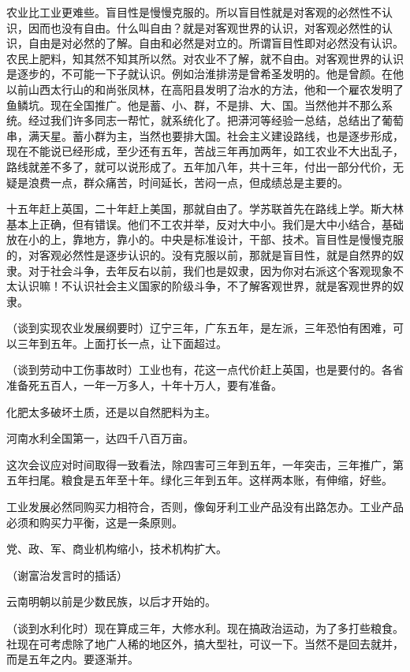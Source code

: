农业比工业更难些。盲目性是慢慢克服的。所以盲目性就是对客观的必然性不认识，因而也没有自由。什么叫自由？就是对客观世界的认识，对客观必然性的认识，自由是对必然的了解。自由和必然是对立的。所谓盲目性即对必然没有认识。农民上肥料，知其然不知其所以然。对农业不了解，就不自由。对客观世界的认识是逐步的，不可能一下子就认识。例如治淮排涝是曾希圣发明的。他是曾颜。在他以前山西太行山的和尚张凤林，在高阳县发明了治水的方法，他和一个雇农发明了鱼鳞坑。现在全国推广。他是蓄、小、群，不是排、大、国。当然他并不那么系统。经过我们许多同志一帮忙，就系统化了。把漭河等经验一总结，总结出了葡萄串，满天星。蓄小群为主，当然也要排大国。社会主义建设路线，也是逐步形成，现在不能说已经形成，至少还有五年，苦战三年再加两年，如工农业不大出乱子，路线就差不多了，就可以说形成了。五年加八年，共十三年，付出一部分代价，无疑是浪费一点，群众痛苦，时间延长，苦闷一点，但成绩总是主要的。

十五年赶上英国，二十年赶上美国，那就自由了。学苏联首先在路线上学。斯大林基本上正确，但有错误。他们不工农并举，反对大中小。我们是大中小结合，基础放在小的上，靠地方，靠小的。中央是标准设计，干部、技术。盲目性是慢慢克服的，对客观必然性是逐步认识的。没有克服以前，那就是盲目性，就是自然界的奴隶。对于社会斗争，去年反右以前，我们也是奴隶，因为你对右派这个客观现象不太认识嘛！不认识社会主义国家的阶级斗争，不了解客观世界，就是客观世界的奴隶。

（谈到实现农业发展纲要时）辽宁三年，广东五年，是左派，三年恐怕有困难，可以三年到五年。上面打长一点，让下面超过。

（谈到劳动中工伤事故时）工业也有，花这一点代价赶上英国，也是要付的。各省准备死五百人，一年一万多人，十年十万人，要有准备。

化肥太多破坏土质，还是以自然肥料为主。

河南水利全国第一，达四千八百万亩。

这次会议应对时间取得一致看法，除四害可三年到五年，一年突击，三年推广，第五年扫尾。粮食是五年至十年。绿化三年到五年。这样两本账，有伸缩，好些。

工业发展必然同购买力相符合，否则，像匈牙利工业产品没有出路怎办。工业产品必须和购买力平衡，这是一条原则。

党、政、军、商业机构缩小，技术机构扩大。

（谢富治发言时的插话）

云南明朝以前是少数民族，以后才开始的。

（谈到水利化时）现在算成三年，大修水利。现在搞政治运动，为了多打些粮食。社现在可考虑除了地广人稀的地区外，搞大型社，可议一下。当然不是回去就并，而是五年之内。要逐渐并。

